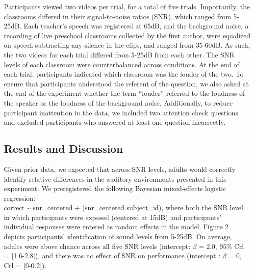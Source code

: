 \documentclass[10pt, letterpaper]{article}
\begin{document}
Participants viewed two videos per trial, for a total of five trials.
Importantly, the classrooms differed in their signal-to-noise ratios
(SNR), which ranged from 5-25dB. Each teacher's speech was registered at
65dB, and the background noise, a recording of live preschool classrooms
collected by the first author, were equalized on speech subtracting any
silence in the clips, and ranged from 35-60dB. As such, the two videos
for each trial differed from 5-25dB from each other. The SNR levels of
each classroom were counterbalanced across conditions. At the end of
each trial, participants indicated which classroom was the louder of the
two. To ensure that participants understood the referent of the
question, we also asked at the end of the experiment whether the term
``louder'' referred to the loudness of the speaker or the loudness of
the background noise. Additionally, to reduce participant inattention in
the data, we included two attention check questions and excluded
participants who answered at least one question incorrectly.

\hypertarget{results-and-discussion}{%
\subsection{\texorpdfstring{\textbf{Results and
Discussion}}{Results and Discussion}}\label{results-and-discussion}}

Given prior data, we expected that across SNR levels, adults would
correctly identify relative differences in the auditory environments
presented in this experiment. We preregistered the following Bayesian
mixed-effects logistic regression:\\
correct \textasciitilde{} snr\_centered + (snr\_centered \textbar{}
subject\_id), where both the SNR level in which participants were
exposed (centered at 15dB) and participants' individual responses were
entered as random effects in the model. Figure 2 depicts participants'
identification of sound levels from 5-25dB. On average, adults were
above chance across all five SNR levels (intercept: \(\beta\) = 2.0,
95\% Crl = {[}1.6-2.8{]}), and there was no effect of SNR on performance
(intercept : \(\beta\) = 0, Crl = {[}0-0.2{]}).
\end{document}
